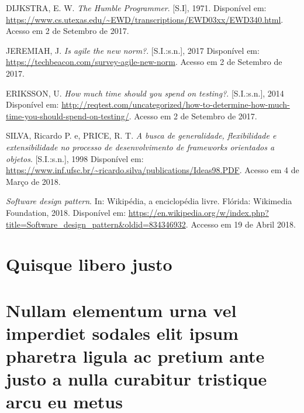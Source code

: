 \documentclass[
    12pt,       %
    openright,      %
    twoside,      %
    a4paper,      %
    english,      %
    french,       %
    spanish,      %
    brazil,       %
    ]{abntex2}
\begin{document}
  \noindent
  DIJKSTRA, E. W. \textit{The Humble Programmer}. [S.I], 1971. Disponível em:
  \url{https://www.cs.utexas.edu/~EWD/transcriptions/EWD03xx/EWD340.html}.
  Acesso em 2 de Setembro de 2017.

  \noindent
  JEREMIAH, J. \textit{Is agile the new norm?}. [S.I.:s.n.], 2017 Disponível em:
  \url{https://techbeacon.com/survey-agile-new-norm}. Acesso em 2 de Setembro de 2017.

  \noindent
  ERIKSSON, U. \textit{How much time should you spend on testing?}. [S.I.:s.n.], 2014 Disponível em: \url{http://reqtest.com/uncategorized/how-to-determine-how-much-time-you-should-spend-on-testing/}. Acesso em 2 de Setembro de 2017.

  \noindent
  SILVA, Ricardo P. e, PRICE, R. T. \textit{A busca de generalidade, flexibilidade e extensibilidade no processo de desenvolvimento de frameworks orientados a objetos}. [S.I.:s.n.], 1998 Disponível em: \url{https://www.inf.ufsc.br/~ricardo.silva/publications/Ideas98.PDF}. Acesso em 4 de Março de 2018.

  \noindent
  \textit{Software design pattern}. In: Wikipédia, a enciclopédia livre. Flórida: Wikimedia Foundation,
  2018. Disponível em:
  \url{https://en.wikipedia.org/w/index.php?title=Software_design_pattern&oldid=834346932}. Accesso
  em 19 de Abril 2018.



  \begin{apendicesenv}

  \partapendices

  \chapter{Quisque libero justo}

  \lipsum[50]

  \chapter{Nullam elementum urna vel imperdiet sodales elit ipsum pharetra ligula
  ac pretium ante justo a nulla curabitur tristique arcu eu metus}
  \lipsum[55-57]

  \end{apendicesenv}
\end{document}

